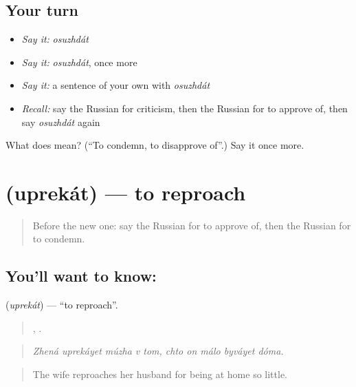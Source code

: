 \subsection*{Your turn}
\begin{itemize}
\raggedright
  \item \emph{Say it:} \emph{osuzhdát}
  \item \emph{Say it:} \emph{osuzhdát}, once more
  \item \emph{Say it:} a sentence of your own with \emph{osuzhdát}
  \item \emph{Recall:} say the Russian for criticism, then the Russian for to approve of, then say \emph{osuzhdát} again
\end{itemize}

\begin{tcolorbox}[breakable,colback=teal!4,colframe=teal!35!black,title={Before you move on}]
What does  mean? (\textquotedblleft{}To condemn, to disapprove of\textquotedblright{}.) Say it once more.
\end{tcolorbox}
\section[\texorpdfstring{\ru{упрекать} (uprekát)}{упрекать (uprekát)}]{ (uprekát) — to reproach}

\label{lesson:RU-C343-uprekat}



\begin{quote}
Before the new one: say the Russian for to approve of, then the Russian for to condemn.
\end{quote}

\subsection*{You'll want to know: }
\textbf{} (\emph{uprekát}) — \textquotedblleft{}to reproach\textquotedblright{}.

\begin{quote}
    ,     .
\end{quote}

\begin{quote}
\emph{Zhená uprekáyet múzha v tom, chto on málo byváyet dóma.}
\end{quote}

\begin{quote}
The wife reproaches her husband for being at home so little.
\end{quote}

